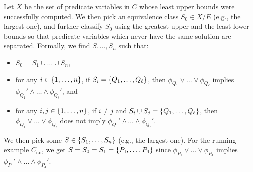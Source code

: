 Let \(X\) be the set of predicate variables in \(C\) whose least upper
bounds were successfully computed.  We then pick an equivalence class
\(S_0 \in X / E\) (e.g., the largest one), and further classify \(S_0\)
using the greatest upper and the least lower bounds so that predicate
variables which never have the same solution are separated.
%
Formally, we find \(S_1\dots,S_n\) such that:
\begin{itemize}
\item \(S_0 = S_1 \cup \dots \cup S_n\),
\item for any \(i \in \{{1,\dots,n}\}\), if \(S_i
=\{{Q_1,\dots,Q_{\ell}}\}\), then \(\phi_{Q_1} \lor \dots \lor
\phi_{Q_{\ell}}\) implies \(\phi_{Q_1}' \land \dots \land
\phi_{Q_{\ell}}'\), and \item for any \(i,j \in \{{1,\dots,n}\}\), if
\(i \neq j\) and \(S_i \cup S_j = \{{Q_1,\dots,Q_{\ell}}\}\), then
\(\phi_{Q_1} \lor \dots \lor \phi_{Q_{\ell}}\) does not imply
\(\phi_{Q_1}' \land \dots \land \phi_{Q_{\ell}}'\).
\end{itemize}
We then pick some \(S \in \{{S_1,\dots,S_n}\}\) (e.g., the largest one).
%
For the running example \(C_{\texttt{cc}}\), we get
\(S=S_0=S_1=\{{P_1,\dots,P_4}\}\) since \(\phi_{P_1} \lor \dots
\lor\phi_{P_4}\) implies \(\phi_{P_1}' \land \dots \land \phi_{P_4}'\).

